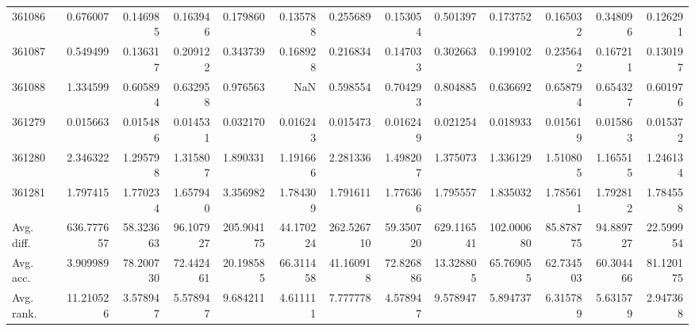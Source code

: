 \begin{tabular}{lrrrrrrrrrrrr}
361086 & 0.676007 & 0.146985 & 0.163946 & 0.179860 & 0.135788 & 0.255689 & 0.153054 & 0.501397 & 0.173752 & 0.165032 & 0.348096 & 0.126291 \\
361087 & 0.549499 & 0.136317 & 0.209122 & 0.343739 & 0.168928 & 0.216834 & 0.147033 & 0.302663 & 0.199102 & 0.235642 & 0.167211 & 0.130197 \\
361088 & 1.334599 & 0.605894 & 0.632958 & 0.976563 & NaN & 0.598554 & 0.704293 & 0.804885 & 0.636692 & 0.658794 & 0.654327 & 0.601976 \\
361279 & 0.015663 & 0.015486 & 0.014531 & 0.032170 & 0.016243 & 0.015473 & 0.016249 & 0.021254 & 0.018933 & 0.015619 & 0.015863 & 0.015372 \\
361280 & 2.346322 & 1.295798 & 1.315807 & 1.890331 & 1.191666 & 2.281336 & 1.498207 & 1.375073 & 1.336129 & 1.510805 & 1.165515 & 1.246134 \\
361281 & 1.797415 & 1.770234 & 1.657940 & 3.356982 & 1.784309 & 1.791611 & 1.776366 & 1.795557 & 1.835032 & 1.785611 & 1.792812 & 1.784558 \\
Avg. diff. & 636.777657 & 58.323663 & 96.107927 & 205.904175 & 44.170224 & 262.526710 & 59.350720 & 629.116541 & 102.000680 & 85.878775 & 94.889727 & 22.599954 \\
Avg. acc. & 3.909989 & 78.200730 & 72.442461 & 20.198585 & 66.311458 & 41.160918 & 72.826886 & 13.328805 & 65.769055 & 62.734503 & 60.304466 & 81.120175 \\
Avg. rank. & 11.210526 & 3.578947 & 5.578947 & 9.684211 & 4.611111 & 7.777778 & 4.578947 & 9.578947 & 5.894737 & 6.315789 & 5.631579 & 2.947368 \\
\bottomrule
\end{tabular}

